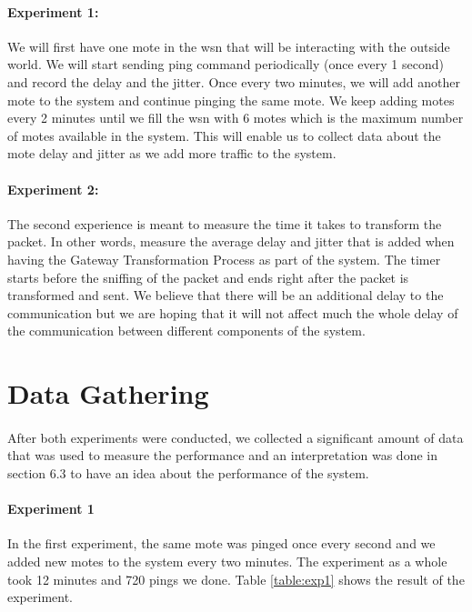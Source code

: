 \documentclass[oneside,12pt,a4paper,final]{book}
\begin{document}
\paragraph{Experiment 1:}
We will first have one mote in the \gls{wsn} that will be interacting with the outside world. We will start sending ping command periodically (once every 1 second) and record the delay and the jitter. Once every two minutes, we will add another mote to the system and continue pinging the same mote. We keep adding motes every 2 minutes until we fill the \gls{wsn} with 6 motes which is the maximum number of motes available in the system. This will enable us to collect data about the mote delay and jitter as we add more traffic to the system.
\paragraph{Experiment 2: }
The second experience is meant to measure the time it takes to transform the packet. In other words, measure the average delay and jitter that is added when having the Gateway Transformation Process as part of the system. The timer starts before the sniffing of the packet and ends right after the packet is transformed and sent.
We believe that there will be an additional delay to the communication but we are hoping that it will not affect much the whole delay of the communication between different components of the system. 
\section{Data Gathering}
\paragraph{}
After both experiments were conducted, we collected a significant amount of data that was used to measure the performance and an interpretation was done in section 6.3 to have an idea about the performance of the system.
\paragraph{Experiment 1}
In the first experiment, the same mote was pinged once every second and we added new motes to the system every two minutes. The experiment as a whole took 12 minutes and 720 pings we done. Table \ref{table:exp1} shows the result of the experiment.
\end{document}
